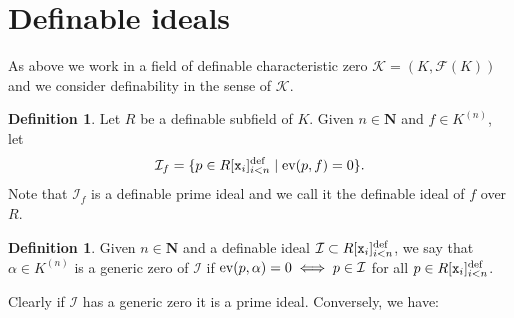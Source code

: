 \documentclass{amsart}
\newcommand{\ca}{\mathcal}
\newcommand{\ideal}[1]{\ca #1}
\theoremstyle{plain}
\theoremstyle{definition}
\newtheorem{defn}[thm]{Definition}
\newcommand{\ev}{\textnormal{ev}}
\newcommand{\F}{\mathcal{F}}
\newcommand{\hn}{\mathbf N}
\newcommand{\polyn}[2]{{#1}[{\tt x}_i]_{i<#2}^\text{def}}
\begin{document}
\section{Definable ideals}\label{sec:definable-ideals}
As above we work in a field of definable characteristic zero $\ca K = (K, \F(K))$ and we consider definability in the sense of $\ca K$. 

\begin{defn}
Let $R$ be a definable subfield of $K$. Given $n \in \hn$ and $f\in K^{(n)}$, let 
%
$${\ideal I}_f = \{p\in \polyn R n \mid \ev(p,f)=0\}.$$
%
 Note that ${\ideal I}_f$ is a definable prime ideal and we call it the definable ideal of $f$ over $R$. 
\end{defn}

\begin{defn}
Given $n\in \hn$ and a definable ideal $\ideal I\subset \polyn R n$, we say that $\alpha\in K^{(n)}$ is a generic zero of $\ideal I$ if $\ev (p, \alpha) = 0 \iff  p\in \ideal I$ for all $p\in \polyn R n$. 
\end{defn}

Clearly if $\ideal I$ has a generic zero it is a prime ideal. 
Conversely, we have:  
\end{document}
